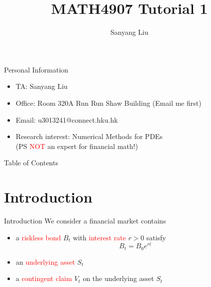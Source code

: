 \documentclass{beamer}
\title{MATH4907 Tutorial 1}
\author{Sanyang Liu}
\begin{document}
\maketitle

\begin{frame}{Personal Information}
\begin{itemize}
    \item TA: Sanyang Liu
    \item Office: Room 320A Run Run Shaw Building (Email me first)
    \item Email: u3013241@connect.hku.hk
    \item Research interest: Numerical Methods for PDEs
    \\(PS \textcolor{red}{NOT} an expert for financial math!)
\end{itemize}
\end{frame}

\begin{frame}{Table of Contents}
    \tableofcontents
\end{frame}


\section[Intro]{Introduction}
\begin{frame}{Introduction}
We consider a financial market contains
\begin{itemize}
    \item a \textcolor{red}{riskless bond} $B_t$ with \textcolor{red}{interest rate} $r>0$ satisfy
    \begin{equation}
        B_t=B_0 e^{rt}
    \end{equation}
    \item an \textcolor{red}{underlying asset} $S_t$
    \item a \textcolor{red}{contingent claim} $V_t$ on the underlying asset $S_t$
\end{itemize}
\end{frame}
\end{document}
